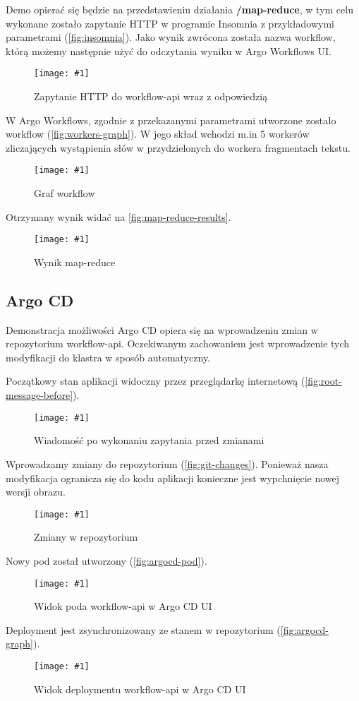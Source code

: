 \documentclass{article}
\newcommand{\img}[4]{
    \begin{figure}[!htbp]
    \centering
    \texttt{[image: \#1]}
    \caption{#2}
    \label{#3}
    \end{figure}
}
\begin{document}
Demo opierać się będzie na przedstawieniu działania \textbf{/map-reduce}, w tym celu wykonane zostało zapytanie HTTP w programie Insomnia z przykładowymi parametrami (\autoref{fig:insomnia}). Jako wynik zwrócona została nazwa workflow, którą możemy następnie użyć do odczytania wyniku w Argo Workflows UI.

\img{img/insomnia.png}{Zapytanie HTTP do workflow-api wraz z odpowiedzią}{fig:insomnia}{0.9}

\newpage

W Argo Workflows, zgodnie z przekazanymi parametrami utworzone zostało workflow (\autoref{fig:workers-graph}). W jego skład wchodzi m.in 5 workerów zliczających wystąpienia słów w przydzielonych do workera fragmentach tekstu.

\img{img/workers_graph.png}{Graf workflow}{fig:workers-graph}{0.9}

Otrzymany wynik widać na \autoref{fig:map-reduce-results}.

\img{img/map_reduce_results.png}{Wynik map-reduce}{fig:map-reduce-results}{0.9}

\newpage
\subsection{Argo CD}
Demonstracja możliwości Argo CD opiera się na wprowadzeniu zmian w repozytorium workflow-api. Oczekiwanym zachowaniem jest wprowadzenie tych modyfikacji do klastra w sposób automatyczny.

Początkowy stan aplikacji widoczny przez przeglądarkę internetową (\autoref{fig:root-message-before}).

\img{img/root_message_before.png}{Wiadomość po wykonaniu zapytania przed zmianami}{fig:root-message-before}{0.9}

Wprowadzamy zmiany do repozytorium (\autoref{fig:git-changes}). Ponieważ nasza modyfikacja ogranicza się do kodu aplikacji konieczne jest wypchnięcie nowej wersji obrazu.

\img{img/git_changes.png}{Zmiany w repozytorium}{fig:git-changes}{0.9}

\newpage
Nowy pod został utworzony (\autoref{fig:argocd-pod}).

\img{img/argocd_pod.png}{Widok poda workflow-api w Argo CD UI}{fig:argocd-pod}{0.9}

Deployment jest zsynchronizowany ze stanem w repozytorium (\autoref{fig:argocd-graph}).

\img{img/argocd_graph.png}{Widok deploymentu workflow-api w Argo CD UI}{fig:argocd-graph}{0.9}
\end{document}
